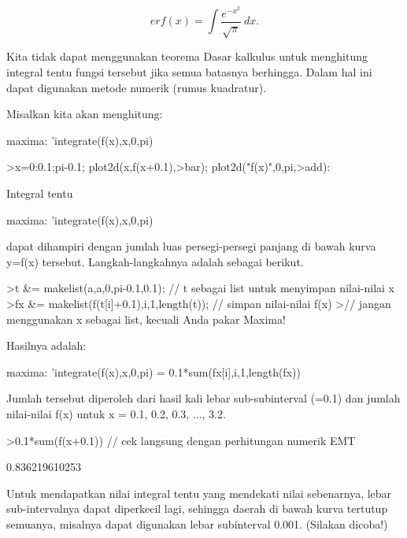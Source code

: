 \documentclass[a4paper,10pt]{article}
\begin{document}
\begin{eulernotebook}
\begin{eulercomment}
\begin{eulercomment}
\begin{eulercomment}
\begin{eulercomment}
\begin{eulercomment}
\end{eulercomment}
\begin{eulerformula}
\[
erf(x) = \int \frac{e^{-x^2}}{\sqrt{\pi}} \ dx.
\]
\end{eulerformula}
\begin{eulercomment}
Kita tidak dapat menggunakan teorema Dasar kalkulus untuk menghitung integral tentu fungsi tersebut jika semua batasnya berhingga.
Dalam hal ini dapat digunakan metode numerik (rumus kuadratur).

Misalkan kita akan menghitung:

maxima: 'integrate(f(x),x,0,pi)
\end{eulercomment}
\begin{eulerprompt}
>x=0:0.1:pi-0.1; plot2d(x,f(x+0.1),>bar); plot2d("f(x)",0,pi,>add):
\end{eulerprompt}
\begin{eulercomment}
Integral tentu

maxima: 'integrate(f(x),x,0,pi)

dapat dihampiri dengan jumlah luas persegi-persegi panjang di bawah kurva y=f(x)
tersebut. Langkah-langkahnya adalah sebagai berikut.
\end{eulercomment}
\begin{eulerprompt}
>t &= makelist(a,a,0,pi-0.1,0.1); // t sebagai list untuk menyimpan nilai-nilai x
>fx &= makelist(f(t[i]+0.1),i,1,length(t)); // simpan nilai-nilai f(x)
>// jangan menggunakan x sebagai list, kecuali Anda pakar Maxima!
\end{eulerprompt}
\begin{eulercomment}
Hasilnya adalah:

maxima: 'integrate(f(x),x,0,pi) = 0.1*sum(fx[i],i,1,length(fx))

Jumlah tersebut diperoleh dari hasil kali lebar sub-subinterval (=0.1) dan jumlah nilai-nilai f(x) untuk
x = 0.1, 0.2, 0.3, ..., 3.2.
\end{eulercomment}
\begin{eulerprompt}
>0.1*sum(f(x+0.1)) // cek langsung dengan perhitungan numerik EMT
\end{eulerprompt}
\begin{euleroutput}
  0.836219610253
\end{euleroutput}
\begin{eulercomment}
Untuk mendapatkan nilai integral tentu yang mendekati nilai sebenarnya, lebar
sub-intervalnya dapat diperkecil lagi, sehingga daerah di bawah kurva tertutup
semuanya, misalnya dapat digunakan lebar subinterval 0.001. (Silakan dicoba!)


\end{eulercomment}
\end{eulercomment}
\end{eulercomment}
\end{eulercomment}
\end{eulercomment}
\end{eulernotebook}
\end{document}
